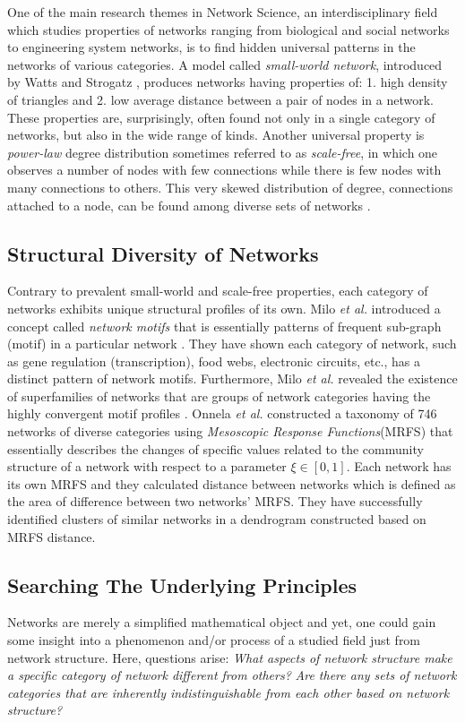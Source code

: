 \documentclass{article}
\begin{document}
	One of the main research themes in Network Science, an interdisciplinary field which studies properties of networks ranging from biological and social networks to engineering system networks, is to find hidden universal patterns in the networks of various categories. A model called \textit{small-world network}, introduced by Watts and Strogatz \cite{watts1998cds}, produces networks having properties of: 1. high density of triangles and 2. low average distance between a pair of nodes in a network. These properties are, surprisingly, often found not only in a single category of networks, but also in the wide range of kinds. Another universal property is \textit{power-law} degree distribution sometimes referred to as \textit{scale-free}, in which one observes a number of nodes with few connections while there is few nodes with many connections to others. This very skewed distribution of degree, connections attached to a node, can be found among diverse sets of networks \cite{Barabasi99emergenceScaling}. 


	\subsection{Structural Diversity of Networks}
	Contrary to prevalent small-world and scale-free properties, each category of networks exhibits unique structural profiles of its own. Milo \textit{et al.} introduced a concept called \textit{network motifs} that is essentially patterns of frequent  sub-graph (motif) in a particular network \cite{Milo_motif}. They have shown each category of network, such as gene regulation (transcription), food webs, electronic circuits, etc., has a distinct pattern of network motifs. Furthermore, Milo \textit{et al.} revealed the existence of superfamilies of networks that  are groups of network categories having the highly convergent motif profiles \cite{Milo_SuperFamily}. Onnela \textit{et al.} constructed a taxonomy of 746 networks  of diverse categories using \textit{Mesoscopic Response Functions}(MRFS) that essentially describes the changes of specific values related to the community structure of a network with respect to a parameter $\xi \in [0,1]$\cite{Onnela_Taxonomy}. Each network has its own MRFS and they calculated distance between networks which is defined as the area of difference between two networks' MRFS. They have successfully identified clusters of similar networks in a dendrogram constructed based on MRFS distance.
	
	\subsection{Searching The Underlying Principles}
Networks are merely a simplified mathematical object and yet, one could gain some insight into a phenomenon and/or process of a studied field just from network structure. Here, questions arise: \textit{What aspects of network structure make a specific category of network different from others?} \textit{Are there any sets of network categories that are inherently indistinguishable from each other based on network structure?}
\end{document}
